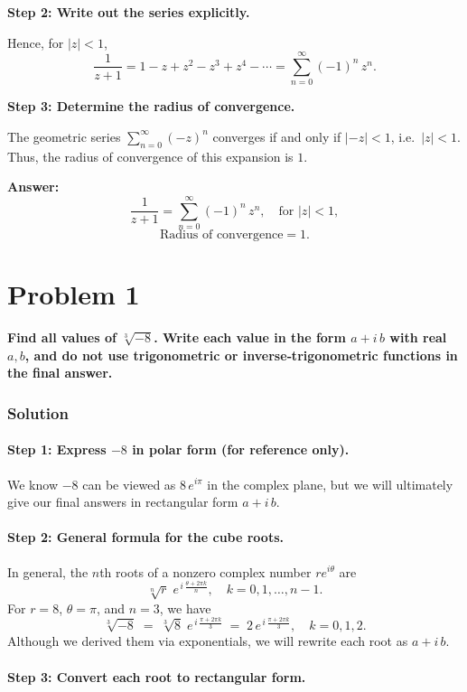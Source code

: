 \documentclass[12pt]{article}
\theoremstyle{definition} %
\theoremstyle{plain} %
\begin{document}
\textbf{Step 2: Write out the series explicitly.}

Hence, for $|z| < 1$,
\[
\frac{1}{z+1} = 1 - z + z^2 - z^3 + z^4 - \cdots = \sum_{n=0}^\infty (-1)^n \, z^n.
\]

\textbf{Step 3: Determine the radius of convergence.}

The geometric series $\sum_{n=0}^\infty (-z)^n$ converges if and only if $|-z| < 1$, i.e.\ $|z| < 1$. Thus, the radius of convergence of this expansion is $1$.

\textbf{Answer:} 
\[
\frac{1}{z+1} = \sum_{n=0}^\infty (-1)^n \, z^n, 
\quad \text{for } |z|<1,
\]
\[
\text{Radius of convergence} = 1.
\]
\section*{Problem 1}
\textbf{Find all values of } $\sqrt[3]{-8}$\textbf{.  Write each value in the form $a + i\,b$ with real $a,b$, and do not use trigonometric or inverse‐trigonometric functions in the final answer.}

\subsubsection*{Solution}

\paragraph{Step 1: Express $-8$ in polar form (for reference only).}
We know $-8$ can be viewed as $8\,e^{i\pi}$ in the complex plane, but we will ultimately give our final answers in rectangular form $a + i\,b$.

\paragraph{Step 2: General formula for the cube roots.}
In general, the $n$th roots of a nonzero complex number $re^{i\theta}$ are
\[
\sqrt[n]{r}\; e^{\,i\,\frac{\theta + 2\pi k}{n}},
\quad k = 0,1,\dots,n-1.
\]
For $r=8$, $\theta = \pi$, and $n=3$, we have
\[
\sqrt[3]{-8}
\;=\;
\sqrt[3]{8}\; e^{\,i\,\frac{\pi + 2\pi k}{3}}
\;=\;
2\, e^{\,i\,\frac{\pi + 2\pi k}{3}},
\quad k=0,1,2.
\]
Although we derived them via exponentials, we will rewrite each root as $a + i\,b$.

\paragraph{Step 3: Convert each root to rectangular form.}
\end{document}
